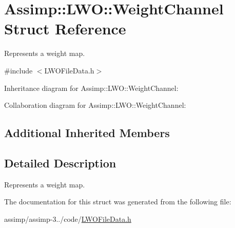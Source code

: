 \hypertarget{struct_assimp_1_1_l_w_o_1_1_weight_channel}{\section{Assimp\+:\+:L\+W\+O\+:\+:Weight\+Channel Struct Reference}
\label{struct_assimp_1_1_l_w_o_1_1_weight_channel}
}


Represents a weight map.  




{\ttfamily \#include $<$L\+W\+O\+File\+Data.\+h$>$}



Inheritance diagram for Assimp\+:\+:L\+W\+O\+:\+:Weight\+Channel\+:


Collaboration diagram for Assimp\+:\+:L\+W\+O\+:\+:Weight\+Channel\+:
\subsection*{Additional Inherited Members}


\subsection{Detailed Description}
Represents a weight map. 

The documentation for this struct was generated from the following file\+:\begin{DoxyCompactItemize}
\item 
assimp/assimp-\/3../code/\hyperlink{_l_w_o_file_data_8h}{L\+W\+O\+File\+Data.\+h}\end{DoxyCompactItemize}
